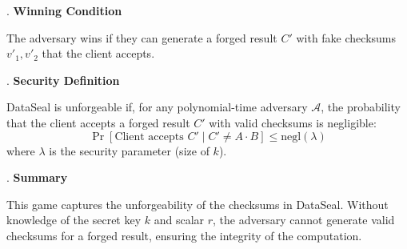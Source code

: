 . \textbf{Winning Condition}

The adversary wins if they can generate a forged result \( C' \) with fake checksums \( v'_1, v'_2 \) that the client accepts.

. \textbf{Security Definition}

DataSeal is unforgeable if, for any polynomial-time adversary \( \mathcal{A} \), the probability that the client accepts a forged result \( C' \) with valid checksums is negligible:
    \[
    \Pr[\text{Client accepts } C' \mid C' \neq A \cdot B] \leq \text{negl}(\lambda)
    \]
    where \( \lambda \) is the security parameter (size of \( k \)).


. \textbf{Summary}

This game captures the unforgeability of the checksums in DataSeal. Without knowledge of the secret key \( k \) and scalar \( r \), the adversary cannot generate valid checksums for a forged result, ensuring the integrity of the computation.








